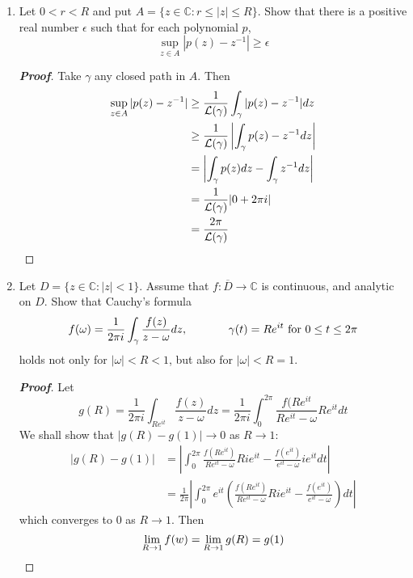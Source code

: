 \documentclass[12pt,leqno]{article}
\theoremstyle{definition}
\newcommand{\C}{\mathbb{C}}
\newcommand{\w}{\omega}
\newenvironment{Proof}{\begin{proof}[\textnormal{\textbf{Proof}}]}{\end{proof}}
\newenvironment{Solution}{\begin{proof}[\textnormal{\textbf{Solution}}]}{\end{proof}}
\begin{document}
\begin{enumerate}
\begin{Solution}
However, \[f_2(z)=\frac{z^2}{(z+1)(z-1)(z-2)}\] does not have an antiderivative. Write \[\frac{z^2}{(z+1)(z-1)(z-2)}=\frac{1/6}{z+1}+\frac{-1/2}{z-1}+\frac{4/3}{z-2}\] Then, for a closed path $\gamma$ in $\{z\in\C:|z|>2\}$, we have \begin{align*}\int_{\gamma}f_2(z)dz&=\int_{\gamma}\frac{1/6}{z+1}dz+\int_{\gamma}\frac{-1/2}{z-1}dz+\int_{\gamma}\frac{4/3}{z-2}dz\\&=2\pi i\left(\frac{1}{6}+\frac{-1}{2}+\frac{4}{3}\right)\\&=2\pi i\not=0\qedhere\end{align*}
 \end{Solution}
 \item Let $0<r<R$ and put $A=\{z\in\C:r\leq|z|\leq R\}$. Show that there is a positive real number $\epsilon$ such that for each polynomial $p$, \[\sup_{z\in A}|p(z)-z^{-1}|\geq\epsilon\]
  \begin{Proof}
   Take $\gamma$ any closed path in $A$. Then \begin{align*}\sup_{z\in A}|p(z)-z^{-1}|&\geq\frac{1}{\mathcal{L}(\gamma)}\int_{\gamma}|p(z)-z^{-1}|dz\\&\geq\frac{1}{\mathcal{L}(\gamma)}\left|\int_{\gamma}p(z)-z^{-1}dz\right|\\&=\left|\int_{\gamma}p(z)dz-\int_{\gamma}z^{-1}dz\right|\\&=\frac{1}{\mathcal{L}(\gamma)}|0+2\pi i|\\&=\frac{2\pi}{\mathcal{L}(\gamma)}\qedhere\end{align*}
  \end{Proof}
 \item Let $D=\{z\in\C:|z|<1\}$. Assume that $f:\overline{D}\to\C$ is continuous, and analytic on $D$. Show that Cauchy's formula \[f(\w)=\frac{1}{2\pi i}\int_{\gamma}\frac{f(z)}{z-\w}dz,\hskip.5in\gamma(t)=Re^{it}\text{ for }0\leq t\leq2\pi\] holds not only for $|\w|<R<1$, but also for $|\w|<R=1$.
  \begin{Proof}
   Let \[g(R)=\frac{1}{2\pi i}\int_{Re^{it}}\frac{f(z)}{z-\w}dz=\frac{1}{2\pi i}\int_0^{2\pi}\frac{f(Re^{it}}{Re^{it}-\w}Re^{it}dt\] We shall show that $|g(R)-g(1)|\to0$ as $R\to1$: \begin{align*}|g(R)-g(1)|&=\left|\int_0^{2\pi}\frac{f(Re^{it})}{Re^{it}-\w}Rie^{it}-\frac{f(e^{it})}{e^{it}-\w}ie^{it}dt\right|\\&=\frac{1}{2\pi}\left|\int_0^{2\pi}e^{it}\left(\frac{f(Re^{it})}{Re^{it}-\w}Rie^{it}-\frac{f(e^{it})}{e^{it}-\w}\right)dt\right|\end{align*} which converges to 0 as $R\to1$. Then \[\lim_{R\to1}f(w)=\lim_{R\to1}g(R)=g(1)\qedhere\]

\end{Proof}
\end{enumerate}
\end{document}
